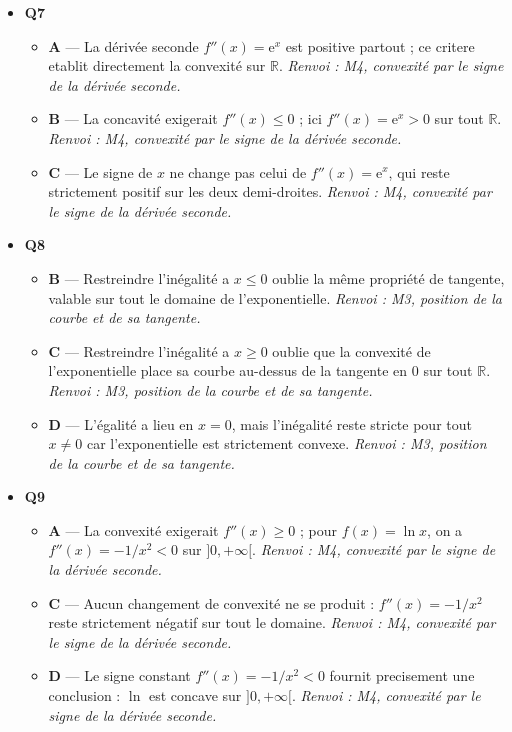 \begin{itemize}
\begin{itemize}
  \end{itemize}
  \item \textbf{Q7}
  \begin{itemize}
    \item \textbf{A} — La dérivée seconde $f''(x)=\mathrm{e}^x$ est positive partout ; ce critere etablit directement la convexité sur $\mathbb{R}$. \emph{Renvoi : M4, convexité par le signe de la dérivée seconde.}
    \item \textbf{B} — La concavité exigerait $f''(x)\leq 0$ ; ici $f''(x)=\mathrm{e}^x>0$ sur tout $\mathbb{R}$. \emph{Renvoi : M4, convexité par le signe de la dérivée seconde.}
    \item \textbf{C} — Le signe de $x$ ne change pas celui de $f''(x)=\mathrm{e}^x$, qui reste strictement positif sur les deux demi-droites. \emph{Renvoi : M4, convexité par le signe de la dérivée seconde.}
  \end{itemize}
  \item \textbf{Q8}
  \begin{itemize}
    \item \textbf{B} — Restreindre l'inégalité a $x\leq0$ oublie la même propriété de tangente, valable sur tout le domaine de l'exponentielle. \emph{Renvoi : M3, position de la courbe et de sa tangente.}
    \item \textbf{C} — Restreindre l'inégalité a $x\geq0$ oublie que la convexité de l'exponentielle place sa courbe au-dessus de la tangente en $0$ sur tout $\mathbb{R}$. \emph{Renvoi : M3, position de la courbe et de sa tangente.}
    \item \textbf{D} — L'égalité a lieu en $x=0$, mais l'inégalité reste stricte pour tout $x\neq0$ car l'exponentielle est strictement convexe. \emph{Renvoi : M3, position de la courbe et de sa tangente.}
  \end{itemize}
  \item \textbf{Q9}
  \begin{itemize}
    \item \textbf{A} — La convexité exigerait $f''(x)\geq0$ ; pour $f(x)=\ln x$, on a $f''(x)=-1/x^2<0$ sur $]0,+\infty[$. \emph{Renvoi : M4, convexité par le signe de la dérivée seconde.}
    \item \textbf{C} — Aucun changement de convexité ne se produit : $f''(x)=-1/x^2$ reste strictement négatif sur tout le domaine. \emph{Renvoi : M4, convexité par le signe de la dérivée seconde.}
    \item \textbf{D} — Le signe constant $f''(x)=-1/x^2<0$ fournit precisement une conclusion : $\ln$ est concave sur $]0,+\infty[$. \emph{Renvoi : M4, convexité par le signe de la dérivée seconde.}

\end{itemize}
\end{itemize}

